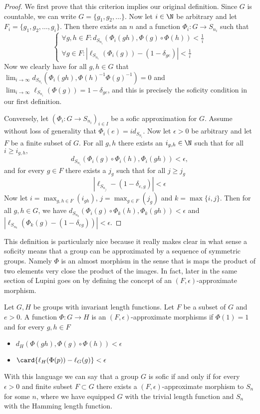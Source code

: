     \begin{proof}
    We first prove that this criterion implies our original definition. Since $G$ is countable, we can write $G = \{g_1, g_2, \dots\}$. Now let $i \in \N$ be arbitrary and let $F_i = \{ g_1, g_2, \dots, g_i\}$. Then there exists an $n$ and a function $\Phi_i: G \to S_{n_i}$ such that
    \[
        \begin{cases}
        \forall g, h \in F: d_{S_{n_i}}(\Phi_i(gh), \Phi(g) \circ \Phi(h)) < \frac 1 i \\
        \forall g \in F: \left|\ell_{S_{n_i}}(\Phi_i(g)) - (1 - \delta_{ge}) \right|< \frac 1 i
        \end{cases}
   \]
   Now we clearly have for all $g,h \in G$ that $\lim_{i \to \infty} d_{S_{n_i}}(\Phi_i(gh), \Phi(h)^{-1} \Phi(g)^{-1}) = 0$ and $\lim_{i \to \infty} \ell_{S_{n_i}}(\Phi(g)) = 1 - \delta_{ge}$,  and this is precisely the soficity condition in our first definition.

   Conversely, let $\left(\Phi_i: G \to S_{n_i} \right)_{i \in I}$ be a sofic approximation for $G$. Assume without loss of generality that $\Phi_i(e) = id_{S_{n_i}}$. Now let $\epsilon > 0$ be arbitrary and let $F$ be a finite subset of $G$.
   For all $g,h$ there exists an $i_{g,h} \in \N$ such that for all $i \geq i_{g,h},$
   \[
   d_{S_{n_i}}(\Phi_i(g) \circ \Phi_i(h), \Phi_i(gh)) < \epsilon,
   \]
   and for every $g \in F$ there exists a $j_g$ such that for all $j \geq j_g$
   \[
        \left| \ell_{S_{n_j}} - (1-\delta_{e,g}) \right| < \epsilon
   \]
   Now let $i = \max_{g,h \in F}(i_{gh})$, $j = \max_{g \in F}(j_g)$ and $k = \max\{i,j\}$.
   Then for all $g,h \in G$, we have
   $ d_{S_{n_k}}(\Phi_i(g) \circ \Phi_k(h), \Phi_k(gh)) < \epsilon$ and $\left| \ell_{S_{n_k}} (\Phi_k(g) - (1- \delta_{eg})) \right| < \epsilon$.

    \end{proof}

	This definition is particularly nice because it really makes clear in what sense a soficity means that a group can be approximated by a sequence of symmetric groups. 
	Namely $\Phi$ is an almost morphism in the sense that is maps the product of two elements very close the product of the images. In fact, later in the same section of \cite{capraro_lupini_2015} Lupini goes on by defining the concept of an $(F, \epsilon)$-approximate morphism. 
	\begin{definition}
		Let $G, H$ be groups with invariant length functions. 
		Let $F$ be a subset of $G$ and  $e > 0$.  
		A function $\Phi:  G \to H$ is an $(F,\epsilon)$-approximate morphisms if $\Phi(1) = 1$ and for every $g, h \in F$ 
		\begin{itemize}
			\item $d_H(\Phi(gh),\Phi(g)\circ \Phi(h)) < \epsilon$
			\item $\card{\ell_H(\Phi(p)) - \ell_G(g)} < \epsilon$
		\end{itemize}
	\end{definition}
	With this language we can say that a group $G$ is sofic if and only if for every $\epsilon >0$ and finite subset $F \subset G$ there exists a $(F,\epsilon)$-approximate morphism to $S_n$ for some  $n$, where we have equipped $G$ with the trivial length function and $S_n$ with the Hamming length function.